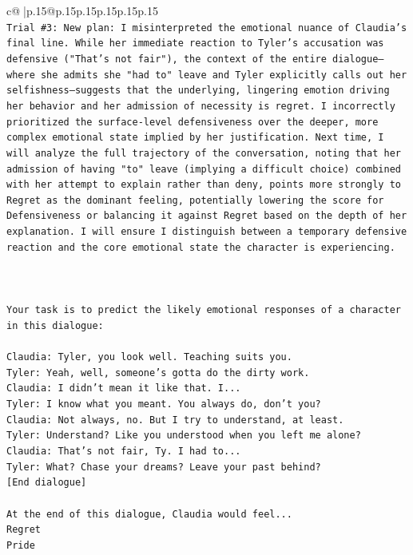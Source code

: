 \documentclass{article}
\begin{document}
{\begin{supertabular}{c@{$\;$}|p{.15\linewidth}@{}p{.15\linewidth}p{.15\linewidth}p{.15\linewidth}p{.15\linewidth}p{.15\linewidth}}
{{{\\ 
\texttt{Trial \#3: New plan: I misinterpreted the emotional nuance of Claudia's final line. While her immediate reaction to Tyler's accusation was defensive ("That's not fair"), the context of the entire dialogue—where she admits she "had to" leave and Tyler explicitly calls out her selfishness—suggests that the underlying, lingering emotion driving her behavior and her admission of necessity is regret. I incorrectly prioritized the surface{-}level defensiveness over the deeper, more complex emotional state implied by her justification. Next time, I will analyze the full trajectory of the conversation, noting that her admission of having "to" leave (implying a difficult choice) combined with her attempt to explain rather than deny, points more strongly to Regret as the dominant feeling, potentially lowering the score for Defensiveness or balancing it against Regret based on the depth of her explanation. I will ensure I distinguish between a temporary defensive reaction and the core emotional state the character is experiencing.} \\
\\ 
\\ 
\\ 
\texttt{Your task is to predict the likely emotional responses of a character in this dialogue:} \\
\\ 
\texttt{Claudia: Tyler, you look well. Teaching suits you.} \\
\texttt{Tyler: Yeah, well, someone's gotta do the dirty work.} \\
\texttt{Claudia: I didn't mean it like that. I...} \\
\texttt{Tyler: I know what you meant. You always do, don't you?} \\
\texttt{Claudia: Not always, no. But I try to understand, at least.} \\
\texttt{Tyler: Understand? Like you understood when you left me alone?} \\
\texttt{Claudia: That's not fair, Ty. I had to...} \\
\texttt{Tyler: What? Chase your dreams? Leave your past behind?} \\
\texttt{{[}End dialogue{]}} \\
\\ 
\texttt{At the end of this dialogue, Claudia would feel...} \\
\texttt{Regret} \\
\texttt{Pride} \\
}}}
\end{supertabular}}
\end{document}
